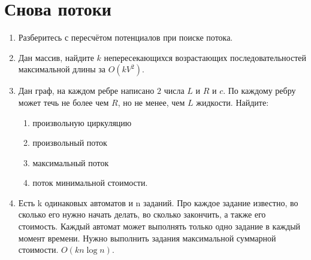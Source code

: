 \section*{Снова потоки}
\begin{enumerate}
	\item Разберитесь с пересчётом потенциалов при поиске потока.
	
	\item Дан массив, найдите $k$ непересекающихся возрастающих последовательностей максимальной длины за $O(kV^2)$.
	
	\item Дан граф, на каждом ребре написано $2$ числа $L$ и $R$ и $c$. По каждому ребру может течь не более
	чем $R$, но не менее, чем $L$ жидкости. Найдите:
	\begin{enumerate}
		\item произвольную циркуляцию
		\item произвольный поток
		\item максимальный поток
		\item поток минимальной стоимости.
	\end{enumerate}
	
	\item Есть k одинаковых автоматов и n заданий. Про каждое задание известно, во сколько его нужно начать делать, во сколько закончить, а также его стоимость. Каждый автомат может выполнять только одно задание в каждый момент времени. Нужно выполнить задания максимальной суммарной стоимости. $O(kn \log n)$.
\end{enumerate}
